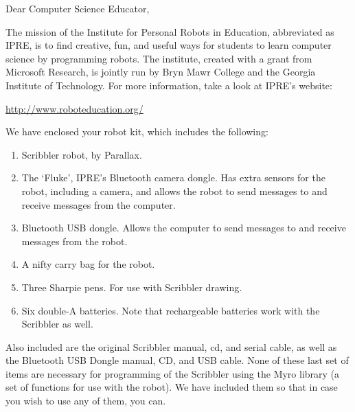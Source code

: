 \documentclass{letter}[10pt]
\begin{document}
\signature{Institute for Personal Robots in Education}

\address{Institute for Personal Robots in Education\\
Park Science Bldg, Room 251\\
Bryn Mawr College\\
101 North Merion Ave\\
Bryn Mawr, PA 19010\\
Tel. (610) 526-5024}

\begin{letter}{}

\opening{Dear Computer Science Educator,}

The mission of the Institute for Personal Robots in Education,
abbreviated as IPRE, is to find creative, fun, and useful ways for
students to learn computer science by programming robots.  The
institute, created with a grant from Microsoft Research, is jointly
run by Bryn Mawr College and the Georgia Institute of Technology.  For
more information, take a look at IPRE's website:

\begin{small}
\url{http://www.roboteducation.org/}
\end{small}

We have enclosed your robot kit, which includes the following:

\begin{enumerate}
\item Scribbler robot, by Parallax.

\item The `Fluke', IPRE's Bluetooth camera dongle.  Has extra sensors
for the robot, including a camera, and allows the robot to send
messages to and receive messages from the computer.
\item Bluetooth USB dongle.  Allows the computer to send messages to
and receive messages from the robot.
\item A nifty carry bag for the robot.
\item Three Sharpie pens.  For use with Scribbler drawing.
\item Six double-A batteries.  Note that rechargeable batteries work
with the Scribbler as well.
\end{enumerate}

Also included are the original Scribbler manual, cd, and serial cable,
as well as the Bluetooth USB Dongle manual, CD, and USB cable. None of
these last set of items are necessary for programming of the Scribbler
using the Myro library (a set of functions for use with the robot).
We have included them so that in case you wish to use any of them, you
can.


\end{letter}
\end{document}
